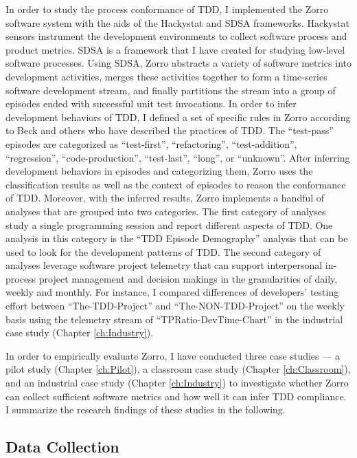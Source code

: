 In order to study the process conformance of TDD, I implemented the Zorro software system with the aids of the Hackystat and SDSA frameworks. Hackystat sensors instrument the development environments to collect software process and product metrics. SDSA is a framework that I have created for studying low-level software processes. Using SDSA, Zorro abstracts a variety of software metrics into development activities, merges these activities together to form a time-series software development stream, and finally partitions the stream into a group of episodes ended with successful unit test invocations. In order to infer development behaviors of TDD, I defined a set of specific rules in Zorro according to Beck \cite{Beck:01,Beck:03} and others who have described the practices of TDD. The ``test-pass'' episodes are categorized as ``test-first'', ``refactoring'', ``test-addition'', ``regression'', ``code-production'', ``test-last'', ``long'', or ``unknown''. After inferring development behaviors in episodes and categorizing them, Zorro uses the classification results as well as the context of episodes to reason the conformance of TDD. Moreover, with the inferred results, Zorro implements a handful of analyses that are grouped into two categories. The first category of analyses study a single programming session and report different aspects of TDD. One analysis in this category is the ``TDD Episode Demography'' analysis that can be used to look for the development patterns of TDD. The second category of analyses leverage software project telemetry \cite{csdl2-04-11,csdl2-06-05} that can support interpersonal in-process project management and decision makings in the granularities of daily, weekly and monthly. For instance, I compared differences of developers' testing effort between ``The-TDD-Project'' and ``The-NON-TDD-Project'' on the weekly basis using the telemetry stream of ``TPRatio-DevTime-Chart'' in the industrial case study (Chapter \ref{ch:Industry}).

In order to empirically evaluate Zorro, I have conducted three case studies --- a pilot study (Chapter \ref{ch:Pilot}), a classroom case study (Chapter \ref{ch:Classroom}), and an industrial case study (Chapter \ref{ch:Industry}) to investigate whether Zorro can collect sufficient software metrics and how well it can infer TDD compliance. I summarize the research findings of these studies in the following.

\subsection{Data Collection}

